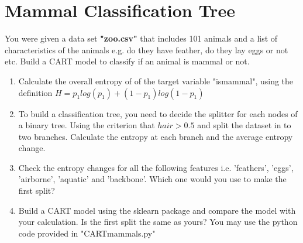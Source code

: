 \documentclass{article}
\begin{document}
\section{Mammal Classification Tree}
You were given a data set \textbf{"zoo.csv"} that includes 101 animals and a list of characteristics of the animals e.g. do they have feather, do they lay eggs or not etc. Build a CART model to classify if an animal is mammal or not.

\begin{enumerate}[(1)]
\item Calculate the overall entropy of of the target variable "ismammal", using the definition $H=p_1 log(p_1)+(1-p_1) log(1-p_1)$
\item To build a classification tree, you need to decide the splitter for each nodes of a binary tree. Using the criterion that $hair>0.5$ and split the dataset in to two branches. Calculate the entropy at each branch and the average entropy change.
\item Check the entropy changes for all the following features i.e. 'feathers', 'eggs', 'airborne', 'aquatic' and 'backbone'. Which one would you use to make the first split?
\item Build a CART model using the sklearn package and compare the model with your calculation. Is the first split the same as yours? You may use the python code provided in "CARTmammals.py"

\end{enumerate}
\end{document}
